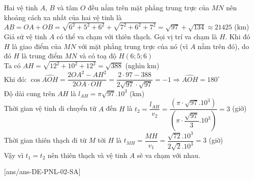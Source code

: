 \begin{ex}
{\begin{itemchoice}
			Hai vệ tinh $A$, $B$ và tâm $O$ đều nằm trên mặt phẳng trung trực của $MN$ nên khoảng cách xa nhất của hai vệ tinh là $AB=OA+OB=\sqrt{6^2+5^2+6^2}+\sqrt{7^2+6^2+7^2}=\sqrt{97}+\sqrt{134}\approx 21425$ (km)\\
			\itemch Giả sử vệ tinh $A$ có thể va chạm với thiên thạch. Gọi vị trí va chạm là $H$. Khi đó $H$ là giao điểm của $MN$ với mặt phẳng trung trực của nó (vì $A$ nằm trên đó), do đó $H$ là trung điểm $MN$ và có toạ độ $H\left(6;5;6\right)$\\
			Ta có $AH=\sqrt{12^2+10^2+12^2}=\sqrt{388}$ (nghìn km)\\
			Khi đó: $\cos\widehat{AOH}=\dfrac{2OA^2-AH^2}{2OA \cdot OH}=\dfrac{2 \cdot 97-388}{2\sqrt{97} \cdot \sqrt{97}}=-1\Rightarrow\widehat{AOH}=180^\circ$\\
			Độ dài cung trên $AH$ là $l_{AH}=\pi\sqrt{97}.10^3$ (km)\\
			Thời gian vệ tinh di chuyển từ $A$ đến $H$ là $t_2=\dfrac{l_{AH}}{v_2}=\dfrac{\left(\pi \cdot \sqrt{97}.10^3\right)}{\left(\pi \cdot \dfrac{\sqrt{97}}{3}.10^3\right)}=3$ (giờ)\\
			Thời gian thiên thạch đi từ $M$ tới $H$ là $t_{MH}=\dfrac{MH}{v_1}=\dfrac{\sqrt{72}.10^3}{2\sqrt{2}.10^3}=3$ (giờ)\\
			Vậy vì $t_1=t_2$ nên thiên thạch và vệ tinh $A$ sẽ va chạm với nhau.
		\end{itemchoice}
	}
\end{ex}
\TNSA
{}[ans/ans-DE-PNL-02-SA]
